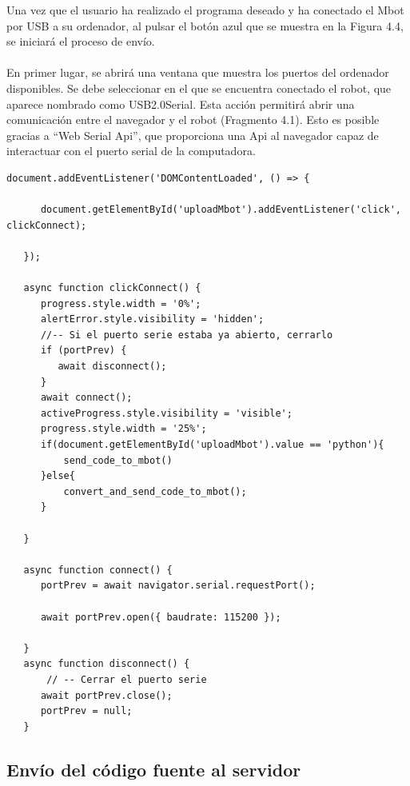 \documentclass{report}
\begin{document}
Una vez que el usuario ha realizado el programa deseado y ha conectado el Mbot por USB a su ordenador, al pulsar el botón azul que se muestra en la Figura 4.4, se iniciará el proceso de envío.
\\
\\
En primer lugar, se abrirá una ventana que muestra los puertos del ordenador disponibles. Se debe seleccionar en el que se encuentra conectado el robot, que aparece nombrado como USB2.0Serial. Esta acción permitirá abrir una comunicación entre el navegador y el robot (Fragmento 4.1). Esto es posible gracias a “Web Serial Api”, que proporciona una Api al navegador capaz de interactuar con el puerto serial de la computadora.
\\
\begin{lstlisting}[frame=single,breaklines=true, label=Abrir conexión con el Mbot por el puerto serie, caption=Abrir conexión con el Mbot por el puerto serie, captionpos=b]  % Inicia el bloque de código
   document.addEventListener('DOMContentLoaded', () => {

      document.getElementById('uploadMbot').addEventListener('click', clickConnect);

   });

   async function clickConnect() {
      progress.style.width = '0%';
      alertError.style.visibility = 'hidden';
      //-- Si el puerto serie estaba ya abierto, cerrarlo
      if (portPrev) {
         await disconnect();
      }
      await connect();
      activeProgress.style.visibility = 'visible';
      progress.style.width = '25%';
      if(document.getElementById('uploadMbot').value == 'python'){
          send_code_to_mbot()
      }else{
          convert_and_send_code_to_mbot();
      }

   }

   async function connect() {
      portPrev = await navigator.serial.requestPort();

      await portPrev.open({ baudrate: 115200 });

   }
   async function disconnect() {
       // -- Cerrar el puerto serie
      await portPrev.close();
      portPrev = null;
   }
\end{lstlisting}


\subsection{Envío del código fuente al servidor}
\end{document}
